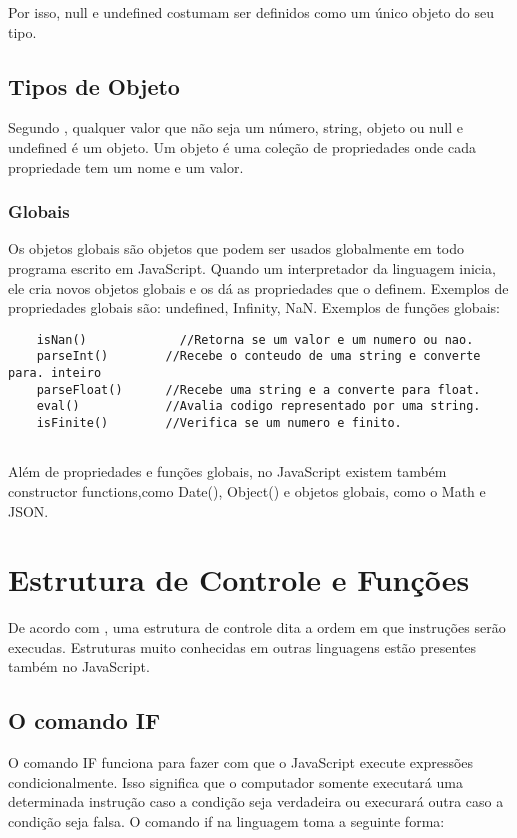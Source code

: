 	Por isso, null e undefined costumam ser definidos como um único objeto do seu tipo.
	
	
	\subsection{Tipos de Objeto}
	Segundo \cite{flanagan2020javascript}, qualquer valor que não seja um número, string, objeto ou null e undefined é um objeto. Um objeto é uma coleção de propriedades onde cada propriedade tem um nome e um valor.
	
	\subsubsection{Globais}
	Os objetos globais são objetos que podem ser usados globalmente em todo programa escrito em JavaScript. Quando um interpretador da linguagem inicia, ele cria novos objetos globais e os dá as propriedades que o definem. 
	Exemplos de propriedades globais são: undefined, Infinity, NaN.
	Exemplos de funções globais: 
	\begin{lstlisting}
	isNan()			  	//Retorna se um valor e um numero ou nao.
	parseInt()		  //Recebe o conteudo de uma string e converte para. inteiro
	parseFloat() 	  //Recebe uma string e a converte para float.
	eval()	  		  //Avalia codigo representado por uma string.
	isFinite()		  //Verifica se um numero e finito.
	
	\end{lstlisting}
	Além de propriedades e funções globais, no JavaScript existem também constructor functions,como Date(), Object() e objetos globais, como o Math e JSON.
	
	
	\section{Estrutura de Controle e Funções}
	De acordo com \cite{flanagan2020javascript}, uma estrutura de controle dita a ordem em que instruções serão execudas. Estruturas muito conhecidas em outras linguagens estão presentes também no JavaScript.
	
	\subsection{O comando IF}
	O comando IF funciona para fazer com que o JavaScript execute expressões condicionalmente. Isso significa que o computador somente executará uma determinada instrução caso a condição seja verdadeira ou execurará outra caso a condição seja falsa.
	O comando if na linguagem toma a seguinte forma:
	
